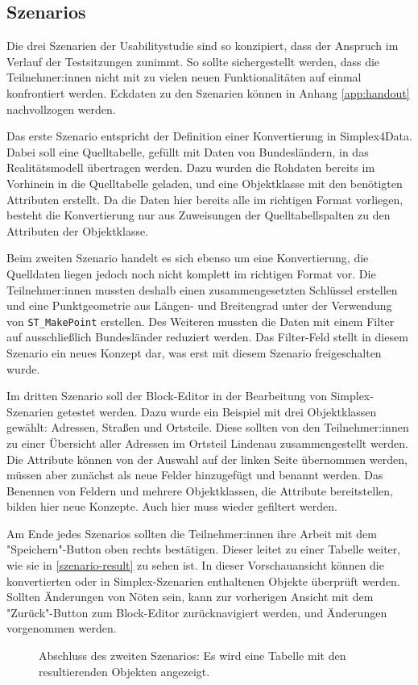 \subsection{Szenarios}
\label{sec:study-szenarios}
Die drei Szenarien der Usabilitystudie sind so konzipiert, dass der Anspruch im Verlauf der Testsitzungen zunimmt. So sollte sichergestellt werden, dass die Teilnehmer:innen nicht mit zu vielen neuen Funktionalitäten auf einmal konfrontiert werden. Eckdaten zu den Szenarien können in Anhang \ref{app:handout} nachvollzogen werden.

Das erste Szenario entspricht der Definition einer Konvertierung in Simplex4Data. Dabei soll eine Quelltabelle, gefüllt mit Daten von Bundesländern, in das Realitätsmodell übertragen werden. Dazu wurden die Rohdaten bereits im Vorhinein in die Quelltabelle geladen, und eine Objektklasse mit den benötigten Attributen erstellt.  Da die Daten hier bereits alle im richtigen Format vorliegen, besteht die Konvertierung nur aus Zuweisungen der Quelltabellspalten zu den Attributen der Objektklasse. 

Beim zweiten Szenario handelt es sich ebenso um eine Konvertierung, die Quelldaten liegen jedoch noch nicht komplett im richtigen Format vor. Die Teilnehmer:innen mussten deshalb einen zusammengesetzten Schlüssel erstellen und eine Punktgeometrie aus Längen- und Breitengrad unter der Verwendung von \texttt{ST\_MakePoint} erstellen. Des Weiteren mussten die Daten mit einem Filter auf ausschließlich Bundesländer reduziert werden. Das Filter-Feld stellt in diesem Szenario ein neues Konzept dar, was erst mit diesem Szenario freigeschalten wurde.

Im dritten Szenario soll der Block-Editor in der Bearbeitung von Simplex-Szenarien getestet werden. Dazu wurde ein Beispiel mit drei Objektklassen gewählt: Adressen, Straßen und Ortsteile. Diese sollten von den Teilnehmer:innen zu einer Übersicht aller Adressen im Ortsteil Lindenau zusammengestellt werden. Die Attribute können von der Auswahl auf der linken Seite übernommen werden, müssen aber zunächst als neue Felder hinzugefügt und benannt werden. Das Benennen von Feldern und mehrere Objektklassen, die Attribute bereitstellen, bilden hier neue Konzepte. Auch hier muss wieder gefiltert werden.

Am Ende jedes Szenarios sollten die Teilnehmer:innen ihre Arbeit mit dem "Speichern"-Button oben rechts bestätigen. Dieser leitet zu einer Tabelle weiter, wie sie in \ref{szenario-result} zu sehen ist. In dieser Vorschauansicht können die konvertierten oder in Simplex-Szenarien enthaltenen Objekte überprüft werden. Sollten Änderungen von Nöten sein, kann zur vorherigen Ansicht mit dem "Zurück"-Button zum Block-Editor zurücknavigiert werden, und Änderungen vorgenommen werden.

\begin{figure}
  \caption{Abschluss des zweiten Szenarios: Es wird eine Tabelle mit den resultierenden Objekten angezeigt.}
  \label{fig:scenario-result}
\end{figure}

